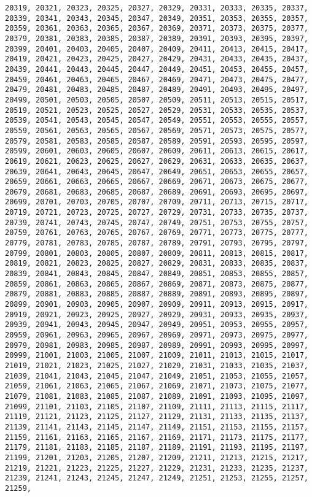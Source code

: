 \documentclass[11pt]{article}
\begin{document}
\begin{Verbatim}[commandchars=\\\{\}]
20319, 20321, 20323, 20325, 20327, 20329, 20331, 20333, 20335, 20337, 20339, 20341, 20343, 20345, 20347, 20349, 20351, 20353, 20355, 20357, 20359, 20361, 20363, 20365, 20367, 20369, 20371, 20373, 20375, 20377, 20379, 20381, 20383, 20385, 20387, 20389, 20391, 20393, 20395, 20397, 20399, 20401, 20403, 20405, 20407, 20409, 20411, 20413, 20415, 20417, 20419, 20421, 20423, 20425, 20427, 20429, 20431, 20433, 20435, 20437, 20439, 20441, 20443, 20445, 20447, 20449, 20451, 20453, 20455, 20457, 20459, 20461, 20463, 20465, 20467, 20469, 20471, 20473, 20475, 20477, 20479, 20481, 20483, 20485, 20487, 20489, 20491, 20493, 20495, 20497, 20499, 20501, 20503, 20505, 20507, 20509, 20511, 20513, 20515, 20517, 20519, 20521, 20523, 20525, 20527, 20529, 20531, 20533, 20535, 20537, 20539, 20541, 20543, 20545, 20547, 20549, 20551, 20553, 20555, 20557, 20559, 20561, 20563, 20565, 20567, 20569, 20571, 20573, 20575, 20577, 20579, 20581, 20583, 20585, 20587, 20589, 20591, 20593, 20595, 20597, 20599, 20601, 20603, 20605, 20607, 20609, 20611, 20613, 20615, 20617, 20619, 20621, 20623, 20625, 20627, 20629, 20631, 20633, 20635, 20637, 20639, 20641, 20643, 20645, 20647, 20649, 20651, 20653, 20655, 20657, 20659, 20661, 20663, 20665, 20667, 20669, 20671, 20673, 20675, 20677, 20679, 20681, 20683, 20685, 20687, 20689, 20691, 20693, 20695, 20697, 20699, 20701, 20703, 20705, 20707, 20709, 20711, 20713, 20715, 20717, 20719, 20721, 20723, 20725, 20727, 20729, 20731, 20733, 20735, 20737, 20739, 20741, 20743, 20745, 20747, 20749, 20751, 20753, 20755, 20757, 20759, 20761, 20763, 20765, 20767, 20769, 20771, 20773, 20775, 20777, 20779, 20781, 20783, 20785, 20787, 20789, 20791, 20793, 20795, 20797, 20799, 20801, 20803, 20805, 20807, 20809, 20811, 20813, 20815, 20817, 20819, 20821, 20823, 20825, 20827, 20829, 20831, 20833, 20835, 20837, 20839, 20841, 20843, 20845, 20847, 20849, 20851, 20853, 20855, 20857, 20859, 20861, 20863, 20865, 20867, 20869, 20871, 20873, 20875, 20877, 20879, 20881, 20883, 20885, 20887, 20889, 20891, 20893, 20895, 20897, 20899, 20901, 20903, 20905, 20907, 20909, 20911, 20913, 20915, 20917, 20919, 20921, 20923, 20925, 20927, 20929, 20931, 20933, 20935, 20937, 20939, 20941, 20943, 20945, 20947, 20949, 20951, 20953, 20955, 20957, 20959, 20961, 20963, 20965, 20967, 20969, 20971, 20973, 20975, 20977, 20979, 20981, 20983, 20985, 20987, 20989, 20991, 20993, 20995, 20997, 20999, 21001, 21003, 21005, 21007, 21009, 21011, 21013, 21015, 21017, 21019, 21021, 21023, 21025, 21027, 21029, 21031, 21033, 21035, 21037, 21039, 21041, 21043, 21045, 21047, 21049, 21051, 21053, 21055, 21057, 21059, 21061, 21063, 21065, 21067, 21069, 21071, 21073, 21075, 21077, 21079, 21081, 21083, 21085, 21087, 21089, 21091, 21093, 21095, 21097, 21099, 21101, 21103, 21105, 21107, 21109, 21111, 21113, 21115, 21117, 21119, 21121, 21123, 21125, 21127, 21129, 21131, 21133, 21135, 21137, 21139, 21141, 21143, 21145, 21147, 21149, 21151, 21153, 21155, 21157, 21159, 21161, 21163, 21165, 21167, 21169, 21171, 21173, 21175, 21177, 21179, 21181, 21183, 21185, 21187, 21189, 21191, 21193, 21195, 21197, 21199, 21201, 21203, 21205, 21207, 21209, 21211, 21213, 21215, 21217, 21219, 21221, 21223, 21225, 21227, 21229, 21231, 21233, 21235, 21237, 21239, 21241, 21243, 21245, 21247, 21249, 21251, 21253, 21255, 21257, 21259, 
\end{Verbatim}
\end{document}
